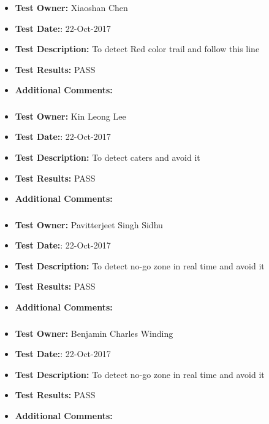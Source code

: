 \documentclass[10pt,a4paper,titlepage]{article}
\begin{document}
\subsubsection*{}
\begin{itemize}
\item \textbf{Test Owner:}  Xiaoshan Chen
\item \textbf{Test Date:}: 22-Oct-2017
\item \textbf{Test Description:} To detect Red color trail and follow this line
\item \textbf{Test Results:} PASS
\item \textbf{Additional Comments:}	
\end{itemize}

\subsubsection*{}
\begin{itemize}
\item \textbf{Test Owner:}  Kin Leong Lee
\item \textbf{Test Date:}: 22-Oct-2017
\item \textbf{Test Description:} To detect caters and avoid it
\item \textbf{Test Results:} PASS
\item \textbf{Additional Comments:}
\end{itemize}

\subsubsection*{}
\begin{itemize}
\item \textbf{Test Owner:}  Pavitterjeet Singh Sidhu
\item \textbf{Test Date:}: 22-Oct-2017
\item \textbf{Test Description:} To detect no-go zone in real time and avoid it
\item \textbf{Test Results:} PASS
\item \textbf{Additional Comments:}	
\end{itemize}

\subsubsection*{}
\begin{itemize}
\item \textbf{Test Owner:} Benjamin Charles Winding
\item \textbf{Test Date:}: 22-Oct-2017
\item \textbf{Test Description:} To detect no-go zone in real time and avoid it
\item \textbf{Test Results:} PASS
\item \textbf{Additional Comments:}
\end{itemize}
\end{document}
